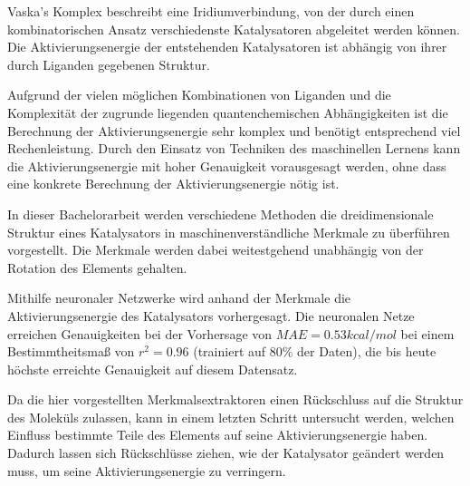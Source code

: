 
\Abstract

Vaska's Komplex beschreibt eine Iridiumverbindung, von der durch einen kombinatorischen Ansatz 
verschiedenste Katalysatoren abgeleitet werden können.
Die Aktivierungsenergie der entstehenden Katalysatoren ist abhängig von ihrer durch
Liganden gegebenen Struktur. 

Aufgrund der vielen möglichen Kombinationen von Liganden und die Komplexität der zugrunde liegenden quantenchemischen 
Abhängigkeiten ist die Berechnung der Aktivierungsenergie sehr komplex und benötigt entsprechend viel Rechenleistung.
Durch den Einsatz von Techniken des maschinellen Lernens kann die Aktivierungsenergie mit hoher Genauigkeit vorausgesagt werden,
ohne dass eine konkrete Berechnung der Aktivierungsenergie nötig ist.

In dieser Bachelorarbeit werden verschiedene Methoden die dreidimensionale Struktur 
eines Katalysators in maschinenverständliche Merkmale zu überführen vorgestellt. 
Die Merkmale werden dabei weitestgehend unabhängig von der Rotation des Elements gehalten.

Mithilfe neuronaler Netzwerke wird anhand der Merkmale die Aktivierungsenergie des Katalysators vorhergesagt.
Die neuronalen Netze erreichen Genauigkeiten bei der Vorhersage von $MAE = 0.53kcal/mol$ bei einem Bestimmtheitsmaß von $r^2 = 0.96$ (trainiert auf 80\% der Daten),
die bis heute höchste erreichte Genauigkeit auf diesem Datensatz.

Da die hier vorgestellten Merkmalsextraktoren einen Rückschluss auf die Struktur des Moleküls zulassen, kann in einem letzten Schritt untersucht werden,
welchen Einfluss bestimmte Teile des Elements auf seine Aktivierungsenergie haben.
Dadurch lassen sich Rückschlüsse ziehen, wie der Katalysator geändert werden muss, um seine Aktivierungsenergie zu verringern.


